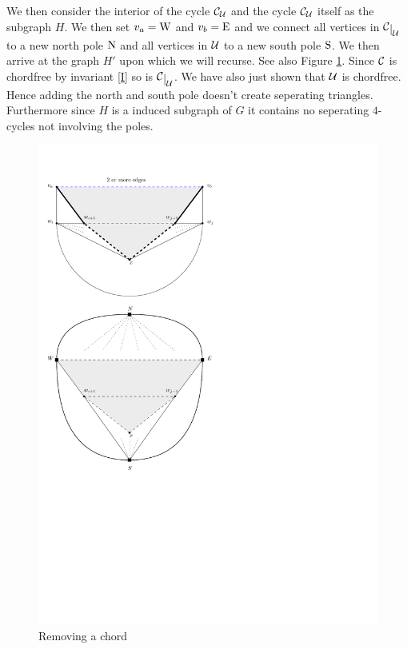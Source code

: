 We then consider the interior of the cycle $\mathcal{C}_{\mathcal{U}}$ and the cycle $\mathcal{C}_{\mathcal{U}}$ itself as the subgraph $H$. We then set $v_a = \mathrm{W}$ and $v_b = \mathrm{E}$ and we connect all vertices in $\restC{\U}$ to a new north pole $\mathrm{N}$ and all vertices in $\mathcal{U}$ to a new south pole $\mathrm{S}$. We then arrive at the graph $H'$ upon which we will recurse. See also Figure \ref{fig:removeChord}. Since $\mathcal{C}$ is chordfree by invariant \ref{I}  so is $\restC{\U}$. We have also just shown that $\mathcal{U}$ is chordfree. Hence adding the north and south pole doesn't create seperating triangles. Furthermore since $H$ is a induced subgraph of $G$ it contains no seperating $4$-cycles not involving the poles.    



\begin{figure}[h!]
\centering
\includegraphics[scale=1]{redAlgo/img/removeChord}

\caption{Removing a chord 
    \label{fig:removeChord}}
\end{figure}

